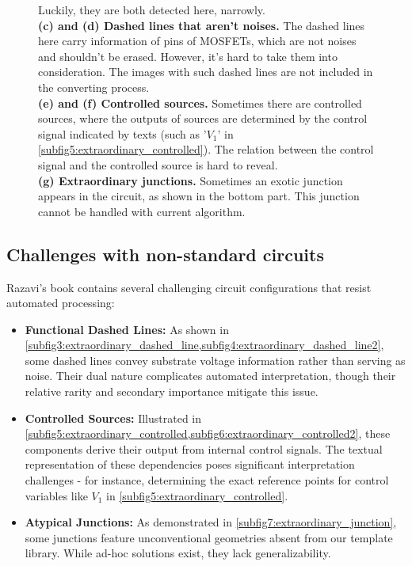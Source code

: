 \documentclass{article}
\begin{document}
\begin{figure}[htbp]
{    Luckily, they are both detected here, narrowly.\\
    \textbf{(c) and (d) Dashed lines that aren't noises.}
    The dashed lines here carry information of pins of MOSFETs, which are not noises and shouldn't be erased.
    However, it's hard to take them into consideration. The images with such dashed lines are not included in the converting process.\\
    \textbf{(e) and (f) Controlled sources.}
    Sometimes there are controlled sources, where the outputs of sources are determined by the control signal indicated by texts (such as '$V_1$' in \cref{subfig5:extraordinary_controlled}).
    The relation between the control signal and the controlled source is hard to reveal.\\
    \textbf{(g) Extraordinary junctions.}
    Sometimes an exotic junction appears in the circuit, as shown in the bottom part. This junction cannot be handled with current algorithm.}
    \label{fig:extraordinary_cases}
\end{figure}

\subsection{Challenges with non-standard circuits}

Razavi's book contains several challenging circuit configurations that resist automated processing:

\begin{itemize}
\item \textbf{Functional Dashed Lines:}
As shown in \cref{subfig3:extraordinary_dashed_line,subfig4:extraordinary_dashed_line2}, 
some dashed lines convey substrate voltage information rather than serving as noise. 
Their dual nature complicates automated interpretation, though their relative rarity and secondary importance mitigate this issue.

\item \textbf{Controlled Sources:}
Illustrated in \cref{subfig5:extraordinary_controlled,subfig6:extraordinary_controlled2}, these components derive their output from internal control signals. The textual representation of these dependencies poses significant interpretation challenges - for instance, determining the exact reference points for control variables like $V_1$ in \cref{subfig5:extraordinary_controlled}.

\item \textbf{Atypical Junctions:}
As demonstrated in \cref{subfig7:extraordinary_junction}, some junctions feature unconventional geometries absent from our template library. While ad-hoc solutions exist, they lack generalizability.
\end{itemize}
\end{document}
